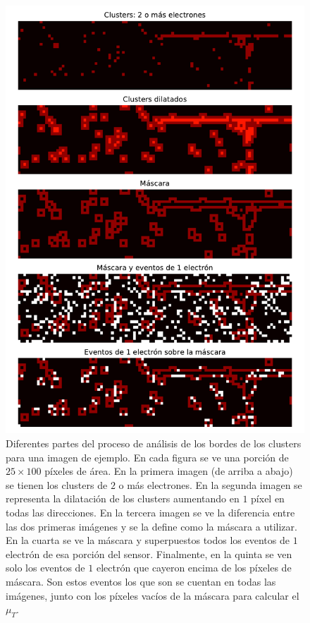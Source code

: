 \begin{figure}[h]
    \centering
    \includegraphics[scale=0.7]{Figs/analisis_bordes.pdf}
    \caption{\footnotesize{Diferentes partes del proceso de análisis de los bordes de los clusters para una imagen de ejemplo. En cada figura se ve una porción de $25 \times 100$ píxeles de área. En la primera imagen (de arriba a abajo) se tienen los clusters de $2$ o más electrones. En la segunda imagen se representa la dilatación de los clusters aumentando en $1$ píxel en todas las direcciones. En la tercera imagen se ve la diferencia entre las dos primeras imágenes y se la define como la máscara a utilizar. En la cuarta se ve la máscara y superpuestos todos los eventos de $1$ electrón de esa porción del sensor. Finalmente, en la quinta se ven solo los eventos de $1$ electrón que cayeron encima de los píxeles de máscara. Son estos eventos los que son se cuentan en todas las imágenes, junto con los píxeles vacíos de la máscara para calcular el $\mu_{T}$.}}
    \label{fig:AnalisisBordes}
\end{figure}
